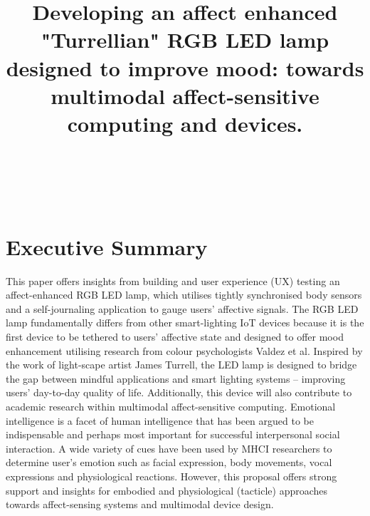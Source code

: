 \documentclass{sigchi}
\begin{document}
\title{Developing an affect enhanced "Turrellian" RGB LED lamp designed to improve mood: towards multimodal affect-sensitive computing and devices.}

\author{
\\
\\
\\
}


\maketitle

\section{Executive Summary}
This paper offers insights from building and user experience (UX) testing an affect-enhanced RGB LED lamp, which utilises tightly synchronised body sensors and a self-journaling application to gauge users’ affective signals. The RGB LED lamp fundamentally differs from other smart-lighting IoT devices because it is the first device to be tethered to users’ affective state and designed to offer mood enhancement utilising research from colour psychologists Valdez et al. Inspired by the work of light-scape artist James Turrell, the LED lamp is designed to bridge the gap between mindful applications and smart lighting systems – improving users’ day-to-day quality of life. Additionally, this device will also contribute to academic research within multimodal affect-sensitive computing. Emotional intelligence is a facet of human intelligence that has been argued to be indispensable and perhaps most important for successful interpersonal social interaction. A wide variety of cues have been used by MHCI researchers to determine user’s emotion such as facial expression, body movements, vocal expressions and physiological reactions. However, this proposal offers strong support and insights for embodied and physiological (tacticle) approaches towards affect-sensing systems and multimodal device design.


\end{document}
